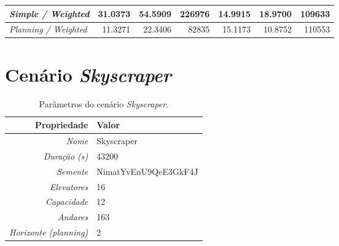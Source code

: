 \begin{table}[htb!]
\begin{tabular}{|l|r|r|r|r|r|r|}
\textit{Simple / Weighted}        & \cellcolor[HTML]{FD6864}31.0373 & \cellcolor[HTML]{FD6864}54.5909 & \cellcolor[HTML]{FD6864}226976  & \cellcolor[HTML]{67FD9A}14.9915 & \cellcolor[HTML]{FD6864}18.9700 & \cellcolor[HTML]{67FD9A}109633  \\ \hline
\textit{Planning / Weighted}      & 11.3271                         & 22.3406                         &  82835                          & 15.1173                         & 10.8752                         & 110553                          \\ \hline
\end{tabular}
\end{table}

\section{Cenário \textit{Skyscraper}}

\lipsum[1]

\begin{table}[htb!]
\centering
\caption{Parâmetros do cenário \textit{Skyscraper}.}
\label{tab:results:skyscraper:params}
\begin{tabular}{|r|l|}
\hline
\textbf{Propriedade}          & \textbf{Valor}       \\ \hline
\textit{Nome}                 & Skyscraper           \\ \hline
\textit{Duração (s)}          & 43200                \\ \hline
\textit{Semente}              & NimatYvEnU9QeE3GkF4J \\ \hline
\textit{Elevatores}           & 16                   \\ \hline
\textit{Capacidade}           & 12                   \\ \hline
\textit{Andares}              & 163                  \\ \hline
\textit{Horizonte (planning)} & 2                    \\ \hline
\end{tabular}
\end{table}

